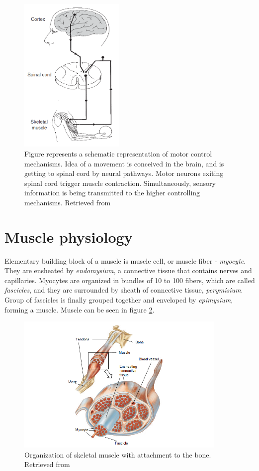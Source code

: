 \begin{figure}[ht]
\centering
\includegraphics[width=0.45\textwidth]{Images/introduction/control-merletti2.png}
\caption{Figure represents a schematic representation of motor control mechanisms. Idea of a movement is conceived in the brain, and is getting to spinal cord by neural pathways. Motor neurons exiting spinal cord trigger muscle contraction. Simultaneously, sensory information is being transmitted to the higher controlling mechanisms. Retrieved from \citep{Merletti-book}}
\label{fig:control-merletti}
\end{figure}


\section{Muscle physiology}

Elementary building block of a muscle is muscle cell, or muscle fiber - \emph{myocyte}. They are ensheated by \emph{endomysium}, a connective tissue that contains nerves and capillaries. Myocytes are organized in bundles of 10 to 100 fibers, which are called \emph{fascicles}, and they are surrounded by sheath of connective tissue, \emph{perymisium}. Group of fascicles is finally grouped together and enveloped by \emph{epimysium}, forming a muscle. Muscle can be seen in figure \ref{fig:muscle}.
\begin{figure}[ht]
\centering
\includegraphics[width=0.9\textwidth]{Images/introduction/muscle2.png}
\caption{Organization of skeletal muscle with attachment to the bone. Retrieved from \citep{Widmaier2014}}
\label{fig:muscle}
\end{figure}

